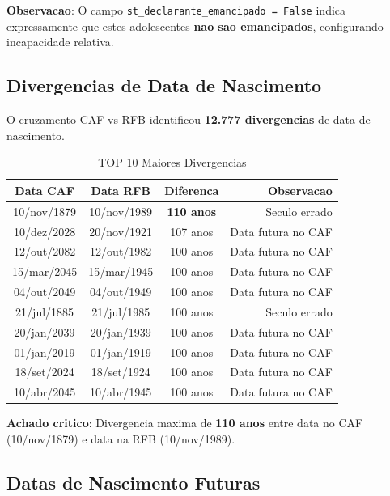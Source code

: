 \documentclass[11pt,a4paper]{article}
\begin{document}
\textbf{Observacao}: O campo \texttt{st\_declarante\_emancipado = False} indica expressamente
que estes adolescentes \textbf{nao sao emancipados}, configurando incapacidade relativa.


\subsection{Divergencias de Data de Nascimento}

O cruzamento CAF vs RFB identificou \textbf{12.777 divergencias} de data de nascimento.

\begin{table}[H]
\centering
\caption{TOP 10 Maiores Divergencias}
\label{tab:divergencias}
\begin{tabular}{cccr}
\toprule
\textbf{Data CAF} & \textbf{Data RFB} & \textbf{Diferenca} & \textbf{Observacao} \\
\midrule
10/nov/1879 & 10/nov/1989 & \textbf{110 anos} & Seculo errado \\
10/dez/2028 & 20/nov/1921 & 107 anos & Data futura no CAF \\
12/out/2082 & 12/out/1982 & 100 anos & Data futura no CAF \\
15/mar/2045 & 15/mar/1945 & 100 anos & Data futura no CAF \\
04/out/2049 & 04/out/1949 & 100 anos & Data futura no CAF \\
21/jul/1885 & 21/jul/1985 & 100 anos & Seculo errado \\
20/jan/2039 & 20/jan/1939 & 100 anos & Data futura no CAF \\
01/jan/2019 & 01/jan/1919 & 100 anos & Data futura no CAF \\
18/set/2024 & 18/set/1924 & 100 anos & Data futura no CAF \\
10/abr/2045 & 10/abr/1945 & 100 anos & Data futura no CAF \\
\bottomrule
\end{tabular}
\end{table}

\textbf{Achado critico}: Divergencia maxima de \textbf{110 anos} entre data no CAF
(10/nov/1879) e data na RFB (10/nov/1989).


\subsection{Datas de Nascimento Futuras}
\end{document}
